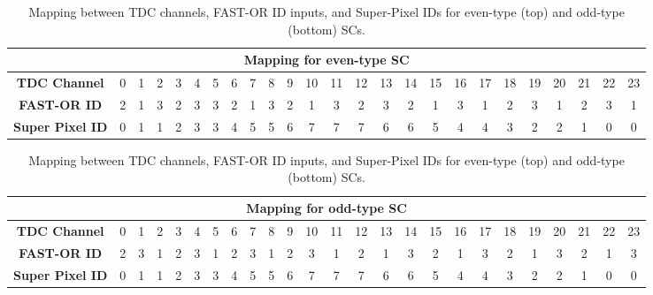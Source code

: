 			\begin{table}[h]
    			\centering
    			\setlength{\tabcolsep}{4pt}
    			\scriptsize
    			\begin{tabular}{|c|*{24}{c|}}
    				\hline 
    				\multicolumn{25}{|c|}{\textbf{Mapping for even-type SC}} \\
       			 	\hline
        			\textbf{TDC Channel} 
        			& 0 & 1 & 2 & 3 & 4 & 5 & 6 & 7 & 8 & 9 & 10 & 11 
        			& 12 & 13 & 14 & 15 & 16 & 17 & 18 & 19 & 20 & 21 & 22 & 23 \\
        			\hline
        			\textbf{FAST-OR ID} 
        			& \cellcolor{fo2}2 & \cellcolor{fo1}1 & \cellcolor{fo3}3 & \cellcolor{fo2}2 & \cellcolor{fo3}3 & \cellcolor{fo3}3 & \cellcolor{fo2}2 & \cellcolor{fo1}1 & \cellcolor{fo3}3 & \cellcolor{fo2}2 & \cellcolor{fo1}1 & \cellcolor{fo3}3 
        			& \cellcolor{fo2}2 & \cellcolor{fo3}3 & \cellcolor{fo2}2 & \cellcolor{fo1}1 & \cellcolor{fo3}3 & \cellcolor{fo1}1 & \cellcolor{fo2}2 & \cellcolor{fo3}3 & \cellcolor{fo1}1 & \cellcolor{fo2}2 & \cellcolor{fo3}3 & \cellcolor{fo1}1 \\
        			\hline
        			\textbf{Super Pixel ID} 
       			 	& 0 & 1 & 1 & 2 & 3 & 3 & 4 & 5 & 5 & 6 & 7 & 7 
       				& 7 & 6 & 6 & 5 & 4 & 4 & 3 & 2 & 2 & 1 & 0 & 0 \\
        			\hline
    			\end{tabular}
    
    			\vspace{4mm}
    
    			\begin{tabular}{|c|*{24}{c|}}
       				\hline 
    				\multicolumn{25}{|c|}{\textbf{Mapping for odd-type SC}} \\
    				\hline
        			\textbf{TDC Channel} 
        			& 0 & 1 & 2 & 3 & 4 & 5 & 6 & 7 & 8 & 9 & 10 & 11 
        			& 12 & 13 & 14 & 15 & 16 & 17 & 18 & 19 & 20 & 21 & 22 & 23 \\
        			\hline
        			\textbf{FAST-OR ID} 
        			& \cellcolor{fo2}2 & \cellcolor{fo3}3 & \cellcolor{fo1}1 & \cellcolor{fo2}2 & \cellcolor{fo3}3 & \cellcolor{fo1}1 & \cellcolor{fo2}2 & \cellcolor{fo3}3 & \cellcolor{fo1}1 & \cellcolor{fo2}2 & \cellcolor{fo3}3 & \cellcolor{fo1}1 
        			& \cellcolor{fo2}2 & \cellcolor{fo1}1 & \cellcolor{fo3}3 & \cellcolor{fo2}2 & \cellcolor{fo1}1 & \cellcolor{fo3}3 & \cellcolor{fo2}2 & \cellcolor{fo1}1 & \cellcolor{fo3}3 & \cellcolor{fo2}2 & \cellcolor{fo1}1 & \cellcolor{fo3}3 \\
        			\hline
        			\textbf{Super Pixel ID} 
        			& 0 & 1 & 1 & 2 & 3 & 3 & 4 & 5 & 5 & 6 & 7 & 7 
        			& 7 & 6 & 6 & 5 & 4 & 4 & 3 & 2 & 2 & 1 & 0 & 0 \\
        			\hline
    			\end{tabular}
    			\caption{Mapping between TDC channels, FAST-OR ID inputs, and Super-Pixel IDs for even-type (top) and odd-type (bottom) SCs.}
    			\label{tab:tdc_fastor_map}
			\end{table}
			
